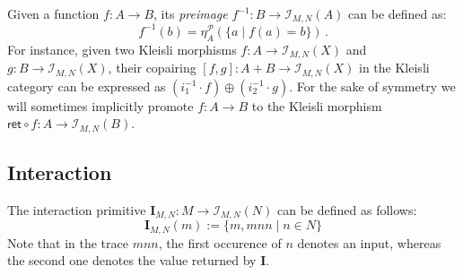 \documentclass[acmsmall,timestamp,review,anonymous]{acmart}
\newcommand{\kw}[1]{\ensuremath{ \mathsf{#1} }}
\newcommand{\bind}{\gg\!\!=}
\begin{document}
Given a function $f : A \rightarrow B$,
its \emph{preimage}
$f^{-1} : B \rightarrow \mathcal{I}_{M,N}(A)$
can be defined as:
\[
    f^{-1}(b) = \eta^\mathcal{P}_A(\{ a \mid f(a) = b \}) \,.
\]
For instance, given two Kleisli morphisms
$f : A \rightarrow \mathcal{I}_{M,N}(X)$ and
$g : B \rightarrow \mathcal{I}_{M,N}(X)$,
their copairing $[f, g] : A + B \rightarrow \mathcal{I}_{M,N}(X)$
in the Kleisli category can be expressed as
$(i_1^{-1} \cdot f) \oplus (i_2^{-1} \cdot g)$.
For the sake of symmetry we will sometimes implicitly promote
$f : A \rightarrow B$ to the Kleisli morphism
$\kw{ret} \circ f : A \rightarrow \mathcal{I}_{M,N}(B)$.


\subsection{Interaction} \label{sec:monad:int} %

The interaction primitive
$\mathbf{I}_{M,N} : M \rightarrow \mathcal{I}_{M,N}(N)$
can be defined as follows:
\[
    \mathbf{I}_{M,N}(m) := \{ m, mnn \mid n \in N \}
\]
Note that in the trace $mnn$,
the first occurence of $n$ denotes an input,
whereas the second one denotes the value returned by $\mathbf{I}$.

%
\end{document}
